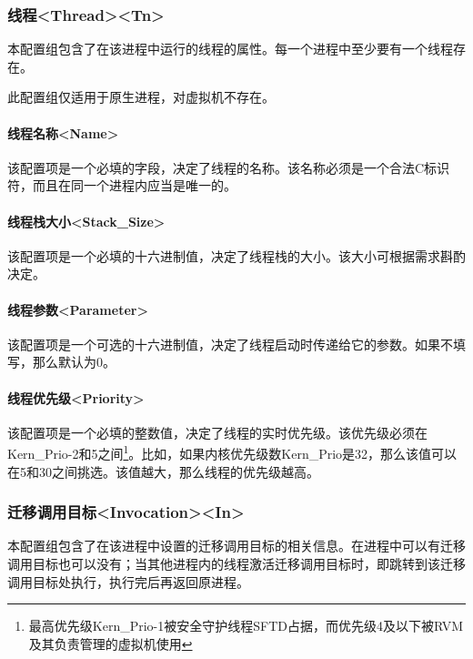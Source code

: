 \subsubsection{线程<Thread><Tn>{}}\label{subsubsec:5-3-14-16}

本配置组包含了在该进程中运行的线程的属性。每一个进程中至少要有一个线程存在。

此配置组仅适用于原生进程，对虚拟机不存在。

\paragraph{线程名称<Name>{}}\label{par:5-3-14-16-1}

该配置项是一个必填的字段，决定了线程的名称。该名称必须是一个合法C标识符，而且在同一个进程内应当是唯一的。

\paragraph{线程栈大小<Stack\_Size>{}}\label{par:5-3-14-16-2}

该配置项是一个必填的十六进制值，决定了线程栈的大小。该大小可根据需求斟酌决定。

\paragraph{线程参数<Parameter>{}}\label{par:5-3-14-16-3}

该配置项是一个可选的十六进制值，决定了线程启动时传递给它的参数。如果不填写，那么默认为0。

\paragraph{线程优先级<Priority>{}}\label{par:5-3-14-16-4}

该配置项是一个必填的整数值，决定了线程的实时优先级。该优先级必须在Kern\_Prio-2和5之间\footnote{最高优先级Kern\_Prio-1被安全守护线程SFTD占据，而优先级4及以下被RVM及其负责管理的虚拟机使用}。比如，如果内核优先级数Kern\_Prio是32，那么该值可以在5和30之间挑选。该值越大，那么线程的优先级越高。

\subsubsection{迁移调用目标<Invocation><In>{}}\label{subsubsec:5-3-14-17}

本配置组包含了在该进程中设置的迁移调用目标的相关信息。在进程中可以有迁移调用目标也可以没有；当其他进程内的线程激活迁移调用目标时，即跳转到该迁移调用目标处执行，执行完后再返回原进程。

